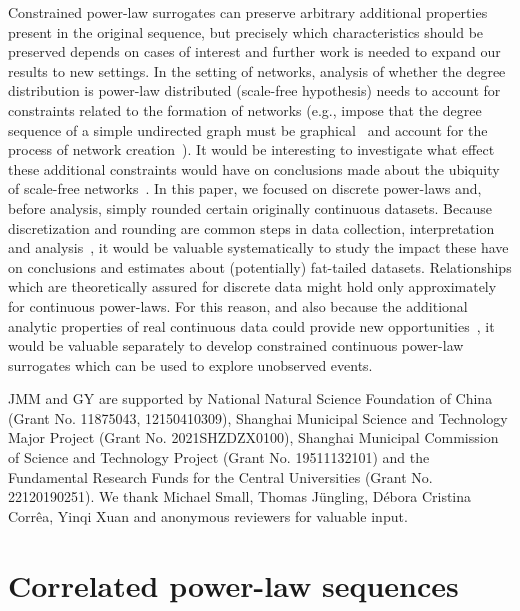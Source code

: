 \documentclass[%
prx,
reprint,
superscriptaddress,
nofootinbib,
 amsmath,amssymb,
 aps,
floatfix,
]{revtex4-2}
\begin{document}
Constrained power-law surrogates can preserve arbitrary additional properties present in the original sequence, but precisely which characteristics should be preserved depends on cases of interest and further work is needed to expand our results to new settings. In the setting of networks, analysis of whether the degree distribution is power-law distributed (scale-free hypothesis) needs to account for constraints related to the formation of networks (e.g., impose that the degree sequence of a simple undirected graph must be graphical~\cite{erdos1960graphs, arratia2005likely} and account for the process of network creation~\cite{chorozoglou2019investigating,falkenberg2020identifying}). It would be interesting to investigate what effect these additional constraints would have on conclusions made about the ubiquity of scale-free networks~\cite{broido2019scale}. In this paper, we focused on discrete power-laws and, before analysis, simply rounded certain originally continuous datasets. Because discretization and rounding are common steps in data collection, interpretation and analysis~\cite{serinaldi2017general}, it would be valuable systematically to study the impact these have on conclusions and estimates about (potentially) fat-tailed datasets. Relationships which are theoretically assured for discrete data might hold only approximately for continuous power-laws. For this reason, and also because the additional analytic properties of real continuous data could provide new opportunities~\cite{diks1995reversibility, kugiumtzis1999test, kugiumtzis2002statically,dimitriadis2018stochastic, lancaster2018surrogate}, it would be valuable separately to develop constrained continuous power-law surrogates which can be used to explore unobserved events.

\begin{acknowledgements}
JMM and GY are supported by National Natural Science Foundation of China (Grant No. 11875043{, 12150410309}), Shanghai Municipal Science and Technology Major Project (Grant No. 2021SHZDZX0100), Shanghai Municipal Commission of Science and Technology Project (Grant No. 19511132101) and the Fundamental Research Funds for the Central Universities (Grant No. 22120190251). We thank Michael Small, Thomas J\"ungling, D\'ebora Cristina Corr\^ea, Yinqi Xuan and anonymous reviewers for valuable input.
\end{acknowledgements}

\appendix

\section{Correlated power-law sequences} \label{sapp:corr}
\end{document}
